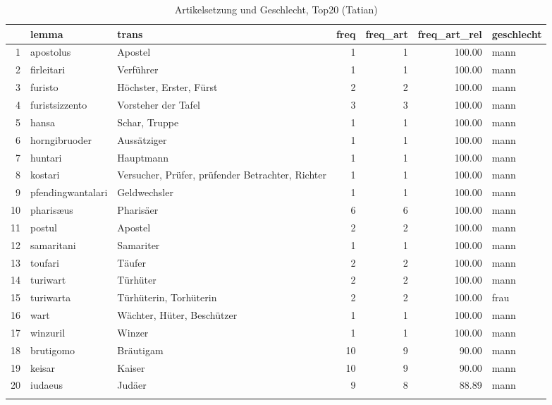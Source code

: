 \begin{table}[ht]
\centering
\begin{tabular}{rllrrrl}
  \lsptoprule
 & lemma & trans & freq & freq\_art & freq\_art\_rel & geschlecht \\ 
  \midrule
1 & apostolus & Apostel &   1 &   1 & 100.00 & mann \\ 
  2 & firleitari & Verführer &   1 &   1 & 100.00 & mann \\ 
  3 & furisto & Höchster, Erster, Fürst &   2 &   2 & 100.00 & mann \\ 
  4 & furistsizzento & Vorsteher der Tafel &   3 &   3 & 100.00 & mann \\ 
  5 & hansa & Schar, Truppe &   1 &   1 & 100.00 & mann \\ 
  6 & horngibruoder & Aussätziger &   1 &   1 & 100.00 & mann \\ 
  7 & huntari & Hauptmann &   1 &   1 & 100.00 & mann \\ 
  8 & kostari & Versucher, Prüfer, prüfender Betrachter, Richter &   1 &   1 & 100.00 & mann \\ 
  9 & pfendingwantalari & Geldwechsler &   1 &   1 & 100.00 & mann \\ 
  10 & pharisæus & Pharisäer &   6 &   6 & 100.00 & mann \\ 
  11 & postul & Apostel &   2 &   2 & 100.00 & mann \\ 
  12 & samaritani & Samariter &   1 &   1 & 100.00 & mann \\ 
  13 & toufari & Täufer &   2 &   2 & 100.00 & mann \\ 
  14 & turiwart & Türhüter &   2 &   2 & 100.00 & mann \\ 
  15 & turiwarta & Türhüterin, Torhüterin &   2 &   2 & 100.00 & frau \\ 
  16 & wart & Wächter, Hüter, Beschützer &   1 &   1 & 100.00 & mann \\ 
  17 & winzuril & Winzer &   1 &   1 & 100.00 & mann \\ 
  18 & brutigomo & Bräutigam &  10 &   9 & 90.00 & mann \\ 
  19 & keisar & Kaiser &  10 &   9 & 90.00 & mann \\ 
  20 & iudaeus & Judäer &   9 &   8 & 88.89 & mann \\ 
   \lspbottomrule
\end{tabular}
\caption{Artikelsetzung und Geschlecht, Top20  (Tatian)} 
\end{table}
